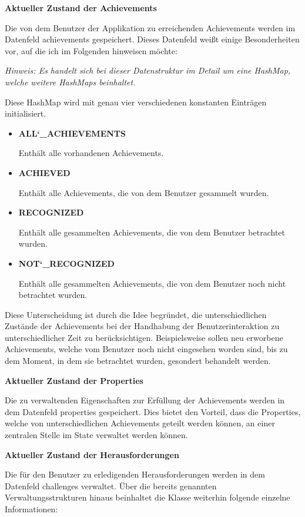 \documentclass[bibliography=totoc,listof=totoc,BCOR=5mm,DIV=12,oneside]{scrbook}
\begin{document}
{\par \bigskip \textbf{Aktueller Zustand der Achievements}
\par Die von dem Benutzer der Applikation zu erreichenden Achievements werden im Datenfeld achievements gespeichert. Dieses Datenfeld weißt einige Besonderheiten vor, auf die ich im Folgenden hinweisen möchte:
\par \medskip  \textit{Hinweis: Es handelt sich bei dieser Datenstruktur im Detail um eine HashMap, welche weitere HashMaps beinhaltet.}
\par \medskip Diese HashMap wird mit genau vier verschiedenen konstanten Einträgen initialisiert.
\begin{itemize}
\item \textbf{ALL\char`_ACHIEVEMENTS}
\par Enthält alle vorhandenen Achievements.
\item \textbf{ACHIEVED}
\par Enthält alle Achievements, die von dem Benutzer gesammelt wurden.
\item \textbf{RECOGNIZED}
\par Enthält alle gesammelten Achievements, die von dem Benutzer betrachtet wurden.
\item \textbf{NOT\char`_RECOGNIZED}
\par Enthält alle gesammelten Achievements, die von dem Benutzer noch nicht betrachtet wurden.
\end{itemize}

\par Diese Unterscheidung ist durch die Idee begründet, die unterschiedlichen Zustände der Achievements bei der Handhabung der Benutzerinteraktion zu unterschiedlicher Zeit zu berücksichtigen. Beispielsweise sollen neu erworbene Achievements, welche vom Benutzer noch nicht eingesehen worden sind, bis zu dem Moment, in dem sie betrachtet wurden, gesondert behandelt werden.

\par \bigskip \textbf{Aktueller Zustand der Properties}
\par Die zu verwaltenden Eigenschaften zur Erfüllung der Achievements werden in dem Datenfeld properties gespeichert. Dies bietet den Vorteil, dass die Properties, welche von unterschiedlichen Achievements geteilt werden können, an einer zentralen Stelle im State verwaltet werden können.

\par \bigskip \textbf{Aktueller Zustand der Herausforderungen}
\par Die für den Benutzer zu erledigenden Herausforderungen werden in dem Datenfeld challenges verwaltet.
Über die bereits genannten Verwaltungsstrukturen hinaus beinhaltet die Klasse weiterhin folgende einzelne Informationen:

}
\end{document}
